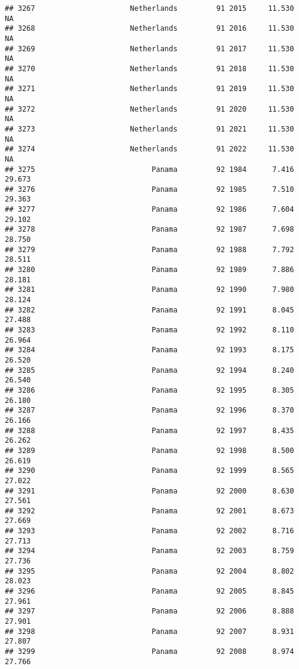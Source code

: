 \documentclass[
]{article}
\begin{document}
\begin{verbatim}
## 3267                      Netherlands         91 2015     11.530         NA
## 3268                      Netherlands         91 2016     11.530         NA
## 3269                      Netherlands         91 2017     11.530         NA
## 3270                      Netherlands         91 2018     11.530         NA
## 3271                      Netherlands         91 2019     11.530         NA
## 3272                      Netherlands         91 2020     11.530         NA
## 3273                      Netherlands         91 2021     11.530         NA
## 3274                      Netherlands         91 2022     11.530         NA
## 3275                           Panama         92 1984      7.416     29.673
## 3276                           Panama         92 1985      7.510     29.363
## 3277                           Panama         92 1986      7.604     29.102
## 3278                           Panama         92 1987      7.698     28.750
## 3279                           Panama         92 1988      7.792     28.511
## 3280                           Panama         92 1989      7.886     28.181
## 3281                           Panama         92 1990      7.980     28.124
## 3282                           Panama         92 1991      8.045     27.488
## 3283                           Panama         92 1992      8.110     26.964
## 3284                           Panama         92 1993      8.175     26.520
## 3285                           Panama         92 1994      8.240     26.540
## 3286                           Panama         92 1995      8.305     26.180
## 3287                           Panama         92 1996      8.370     26.166
## 3288                           Panama         92 1997      8.435     26.262
## 3289                           Panama         92 1998      8.500     26.619
## 3290                           Panama         92 1999      8.565     27.022
## 3291                           Panama         92 2000      8.630     27.561
## 3292                           Panama         92 2001      8.673     27.669
## 3293                           Panama         92 2002      8.716     27.713
## 3294                           Panama         92 2003      8.759     27.736
## 3295                           Panama         92 2004      8.802     28.023
## 3296                           Panama         92 2005      8.845     27.961
## 3297                           Panama         92 2006      8.888     27.901
## 3298                           Panama         92 2007      8.931     27.807
## 3299                           Panama         92 2008      8.974     27.766

\end{verbatim}
\end{document}
